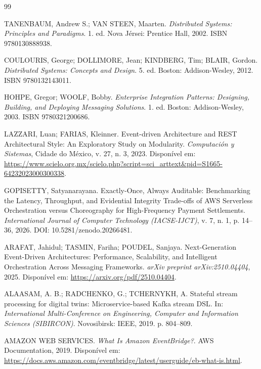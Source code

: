 \documentclass[12pt, a4paper]{article}
\begin{document}
\newpage
\renewcommand{\refname}{Referências Bibliográficas}
\begin{thebibliography}{99}

TANENBAUM, Andrew S.; VAN STEEN, Maarten. \textit{Distributed Systems: Principles and Paradigms}. 1. ed. Nova Jérsei: Prentice Hall, 2002. ISBN 9780130888938.

COULOURIS, George; DOLLIMORE, Jean; KINDBERG, Tim; BLAIR, Gordon. \textit{Distributed Systems: Concepts and Design}. 5. ed. Boston: Addison-Wesley, 2012. ISBN 9780132143011.

HOHPE, Gregor; WOOLF, Bobby. \textit{Enterprise Integration Patterns: Designing, Building, and Deploying Messaging Solutions}. 1. ed. Boston: Addison-Wesley, 2003. ISBN 9780321200686.

LAZZARI, Luan; FARIAS, Kleinner. Event-driven Architecture and REST Architectural Style: An Exploratory Study on Modularity. \textit{Computación y Sistemas}, Cidade do México, v. 27, n. 3, 2023. Disponível em: \url{https://www.scielo.org.mx/scielo.php?script=sci_arttext&pid=S1665-64232023000300338}.

GOPISETTY, Satyanarayana. Exactly-Once, Always Auditable: Benchmarking the Latency, Throughput, and Evidential Integrity Trade-offs of AWS Serverless Orchestration versus Choreography for High-Frequency Payment Settlements. \textit{International Journal of Computer Technology (IACSE-IJCT)}, v. 7, n. 1, p. 14--36, 2026. DOI: 10.5281/zenodo.20266481.

ARAFAT, Jahidul; TASMIN, Fariha; POUDEL, Sanjaya. Next-Generation Event-Driven Architectures: Performance, Scalability, and Intelligent Orchestration Across Messaging Frameworks. \textit{arXiv preprint arXiv:2510.04404}, 2025. Disponível em: \url{https://arxiv.org/pdf/2510.04404}.

ALAASAM, A. B.; RADCHENKO, G.; TCHERNYKH, A. Stateful stream processing for digital twins: Microservice-based Kafka stream DSL. In: \textit{International Multi-Conference on Engineering, Computer and Information Sciences (SIBIRCON)}. Novosibirsk: IEEE, 2019. p. 804--809.

AMAZON WEB SERVICES. \textit{What Is Amazon EventBridge?}. AWS Documentation, 2019. Disponível em: \url{https://docs.aws.amazon.com/eventbridge/latest/userguide/eb-what-is.html}.

\end{thebibliography}
\end{document}
